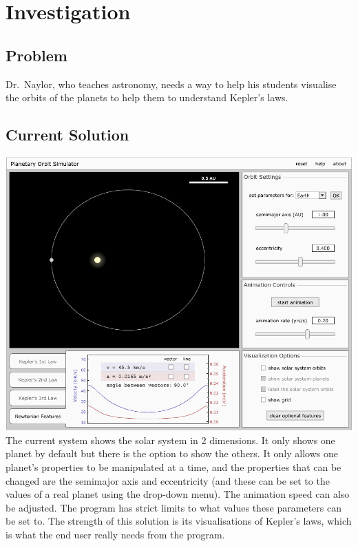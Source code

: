 \documentclass[a4paper,11pt,titlepage]{article}
\begin{document}
\section{Investigation}

\subsection{Problem}
Dr.~Naylor, who teaches astronomy, needs a way to help his students visualise
the orbits of the planets to help them to understand Kepler's laws. 

\subsection{Current Solution}
\includegraphics[width=\textwidth]{existing-solution.png}
The current system shows the solar system in 2 dimensions. It only shows one
planet by default but there is the option to show the others. It only allows one
planet's properties to be manipulated at a time, and the properties that can be
changed are the semimajor axis and eccentricity (and these can be set to the
values of a real planet using the drop-down menu). The animation speed can also
be adjusted. The program has strict limits to what values these parameters can
be set to. The strength of this solution is its visualisations of Kepler's laws,
which is what the end user really needs from the program. 
\end{document}
